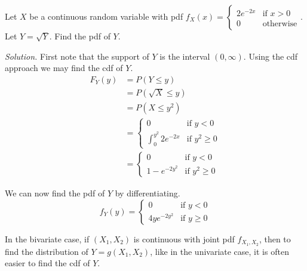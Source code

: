 \begin{example}[]
	Let $X$ be a continuous random variable with pdf $f_X(x)=\begin{cases}
		2e^{-2x} & \text{if $x>0$}\\
		0 & \text{otherwise}
	\end{cases}$.
	Let $Y=\sqrt Y$. Find the pdf of $Y$.

	\textit{Solution.} First note that the support of $Y$ is the interval $(0,\infty)$. Using the cdf approach we may find the cdf of $Y$.
	\begin{align*}
		F_Y(y)&=P(Y\leq y)\\
		&=P(\sqrt X\leq y)\\
		&=P(X\leq y^2)\\
		&=\begin{cases}
			0 & \text{if $y<0$}\\
			\int_0^{y^2}2e^{-2x} & \text{if $y^2\geq0$}
		\end{cases}\\
		&=\begin{cases}
			0 & \text{if $y<0$}\\
			1-e^{-2y^2} & \text{if $y^2\geq0$}
		\end{cases}
	\end{align*}

	We can now find the pdf of $Y$ by differentiating.
	$$f_Y(y)=\begin{cases}
			0 & \text{if $y<0$}\\
			4ye^{-2y^2} & \text{if $y\geq0$}
		\end{cases}$$
\end{example}

In the bivariate case, if $(X_1,X_2)$ is continuous with joint pdf $f_{X_1,X_2}$, then to find the distribution of $Y=g(X_1,X_2)$, like in the univariate case, it is often easier to find the cdf of $Y$.

